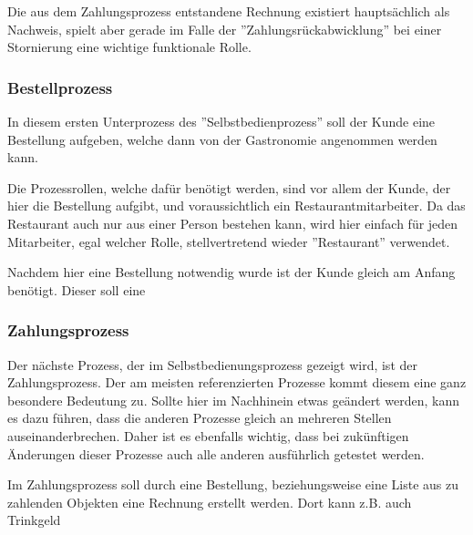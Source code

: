 Die aus dem Zahlungsprozess entstandene Rechnung existiert hauptsächlich als Nachweis, spielt aber gerade im Falle der ''Zahlungsrückabwicklung'' bei einer Stornierung eine wichtige funktionale Rolle.

\subsubsection{Bestellprozess}
In diesem ersten Unterprozess des ''Selbstbedienprozess'' soll der Kunde eine Bestellung aufgeben, welche dann von der Gastronomie angenommen werden kann. 

Die Prozessrollen, welche dafür benötigt werden, sind vor allem der Kunde, der hier die Bestellung aufgibt, und voraussichtlich ein Restaurantmitarbeiter. Da das Restaurant auch nur aus einer Person bestehen kann, wird hier einfach für jeden Mitarbeiter, egal welcher Rolle, stellvertretend wieder ''Restaurant'' verwendet. 

\clearpage
{}

Nachdem hier eine Bestellung notwendig wurde ist der Kunde gleich am Anfang benötigt. Dieser soll eine


\subsubsection{Zahlungsprozess}
Der nächste Prozess, der im Selbstbedienungsprozess gezeigt wird, ist der Zahlungsprozess. Der am meisten referenzierten Prozesse kommt diesem eine ganz besondere Bedeutung zu. Sollte hier im Nachhinein etwas geändert werden, kann es dazu führen, dass die anderen Prozesse gleich an mehreren Stellen auseinanderbrechen. Daher ist es ebenfalls wichtig, dass bei zukünftigen Änderungen dieser Prozesse auch alle anderen ausführlich getestet werden.

Im Zahlungsprozess soll durch eine Bestellung, beziehungsweise eine Liste aus zu zahlenden Objekten eine Rechnung erstellt werden. Dort kann z.B. auch Trinkgeld 

\clearpage
{}

